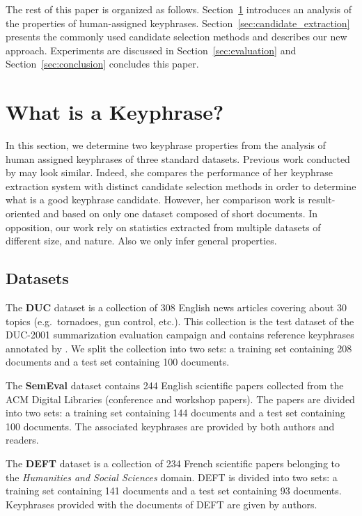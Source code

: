   The rest of this paper is organized as follows.
  Section~\ref{sec:definition_of_candidate_keyphrases} introduces an analysis of
  the properties of human-assigned keyphrases.
  Section~\ref{sec:candidate_extraction} presents the commonly used candidate
  selection methods and describes our new approach. Experiments are discussed in
  Section~\ref{sec:evaluation} and Section~\ref{sec:conclusion} concludes this
  paper.

\section{What is a Keyphrase?}
\label{sec:definition_of_candidate_keyphrases}
  In this section, we determine two keyphrase properties from the analysis of
  human assigned keyphrases of three standard datasets. Previous work conducted
  by  may look similar. Indeed, she compares
  the performance of her keyphrase extraction system with distinct candidate
  selection methods in order to determine what is a good keyphrase candidate.
  However, her comparison work is result-oriented and based on only one dataset
  composed of short documents. In opposition, our work rely on statistics
  extracted from multiple datasets of different size, and nature. Also we only
  infer general properties.

  \subsection{Datasets}
  \label{subsec:keyphrase_extraction_datasets}
    The \textbf{DUC} dataset \cite{over2001duc} is a collection of 308 English
    news articles covering about 30 topics (e.g.~tornadoes, gun control, etc.).
    This collection is the test dataset of the DUC-2001 summarization evaluation
    campaign and contains reference keyphrases annotated by
    . We split the collection into two sets: a
    training set containing 208 documents and a test set containing 100
    documents.

    The \textbf{SemEval} dataset \cite{kim2010semeval} contains 244 English
    scientific papers collected from the ACM Digital Libraries (conference and
    workshop papers). The papers are divided into two sets: a training set
    containing 144 documents and a test set containing 100 documents. The
    associated keyphrases are provided by both authors and readers.

    The \textbf{DEFT} dataset \cite{paroubek2012deft} is a collection of 234
    French scientific papers belonging to the \textit{Humanities and Social
    Sciences} domain. DEFT is divided into two sets: a training set containing
    141 documents and a test set containing 93 documents. Keyphrases provided
    with the documents of DEFT are given by authors.

